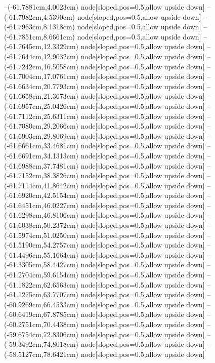 --(-61.7881cm,4.0023cm) node[sloped,pos=0.5,allow upside down]{\ArrowIn}
--(-61.7982cm,4.5390cm) node[sloped,pos=0.5,allow upside down]{\arrowIn}
--(-61.7963cm,8.1318cm) node[sloped,pos=0.5,allow upside down]{\ArrowIn}
--(-61.7851cm,8.6661cm) node[sloped,pos=0.5,allow upside down]{\arrowIn}
--(-61.7645cm,12.3329cm) node[sloped,pos=0.5,allow upside down]{\ArrowIn}
--(-61.7644cm,12.9032cm) node[sloped,pos=0.5,allow upside down]{\arrowIn}
--(-61.7242cm,16.5058cm) node[sloped,pos=0.5,allow upside down]{\ArrowIn}
--(-61.7004cm,17.0761cm) node[sloped,pos=0.5,allow upside down]{\arrowIn}
--(-61.6634cm,20.7793cm) node[sloped,pos=0.5,allow upside down]{\ArrowIn}
--(-61.6658cm,21.3673cm) node[sloped,pos=0.5,allow upside down]{\arrowIn}
--(-61.6957cm,25.0426cm) node[sloped,pos=0.5,allow upside down]{\ArrowIn}
--(-61.7112cm,25.6311cm) node[sloped,pos=0.5,allow upside down]{\arrowIn}
--(-61.7080cm,29.2066cm) node[sloped,pos=0.5,allow upside down]{\ArrowIn}
--(-61.6903cm,29.8069cm) node[sloped,pos=0.5,allow upside down]{\arrowIn}
--(-61.6661cm,33.4681cm) node[sloped,pos=0.5,allow upside down]{\ArrowIn}
--(-61.6691cm,34.1313cm) node[sloped,pos=0.5,allow upside down]{\arrowIn}
--(-61.6988cm,37.7481cm) node[sloped,pos=0.5,allow upside down]{\ArrowIn}
--(-61.7152cm,38.3826cm) node[sloped,pos=0.5,allow upside down]{\arrowIn}
--(-61.7114cm,41.8642cm) node[sloped,pos=0.5,allow upside down]{\ArrowIn}
--(-61.6920cm,42.5154cm) node[sloped,pos=0.5,allow upside down]{\arrowIn}
--(-61.6451cm,46.0227cm) node[sloped,pos=0.5,allow upside down]{\ArrowIn}
--(-61.6298cm,46.8106cm) node[sloped,pos=0.5,allow upside down]{\arrowIn}
--(-61.6038cm,50.2372cm) node[sloped,pos=0.5,allow upside down]{\ArrowIn}
--(-61.5974cm,51.0250cm) node[sloped,pos=0.5,allow upside down]{\arrowIn}
--(-61.5190cm,54.2757cm) node[sloped,pos=0.5,allow upside down]{\ArrowIn}
--(-61.4496cm,55.1664cm) node[sloped,pos=0.5,allow upside down]{\arrowIn}
--(-61.3305cm,58.4427cm) node[sloped,pos=0.5,allow upside down]{\ArrowIn}
--(-61.2704cm,59.6154cm) node[sloped,pos=0.5,allow upside down]{\ArrowIn}
--(-61.1822cm,62.6563cm) node[sloped,pos=0.5,allow upside down]{\ArrowIn}
--(-61.1275cm,63.7707cm) node[sloped,pos=0.5,allow upside down]{\ArrowIn}
--(-60.9269cm,66.4533cm) node[sloped,pos=0.5,allow upside down]{\ArrowIn}
--(-60.6419cm,67.8785cm) node[sloped,pos=0.5,allow upside down]{\ArrowIn}
--(-60.2751cm,70.4438cm) node[sloped,pos=0.5,allow upside down]{\ArrowIn}
--(-59.6754cm,72.8306cm) node[sloped,pos=0.5,allow upside down]{\ArrowIn}
--(-59.3492cm,74.8018cm) node[sloped,pos=0.5,allow upside down]{\ArrowIn}
--(-58.5127cm,78.6421cm) node[sloped,pos=0.5,allow upside down]{\ArrowIn}
